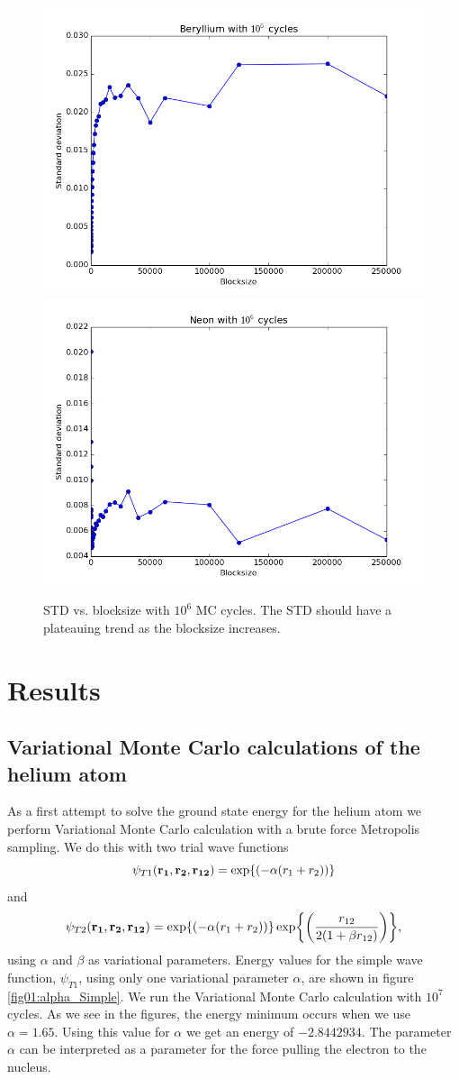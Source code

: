 \documentclass[x11names]{article}
\begin{document}
		\begin{figure}
			\centering \includegraphics[width=0.45\linewidth]{../figures/Beryllium_blocking}
			\centering \includegraphics[width=0.45\linewidth]{../figures/Neon_blocking}
			\protect\caption{STD vs. blocksize with $10^{6}$ MC cycles.  The STD should have a plateauing trend as the blocksize increases.} \label{fig01:std_Stuff}
		\end{figure}


\section{Results}
	\subsection{Variational Monte Carlo calculations of the helium
atom}
		As a first attempt to solve the ground state energy for the helium
		atom we perform Variational Monte Carlo calculation with a brute force
		Metropolis sampling. We do this with two trial wave functions
		\[
		\psi_{T1}({\bf r_{1}},{\bf r_{2}},{\bf r_{12}})=\exp{\left(-\alpha(r_{1}+r_{2})\right)}
		\]
		and
		\[
		\psi_{T2}({\bf r_{1}},{\bf r_{2}},{\bf r_{12}})=\exp{\left(-\alpha(r_{1}+r_{2})\right)}\exp{\left(\frac{r_{12}}{2(1+\beta r_{12})}\right)},
		\]
		using $\alpha$ and $\beta$ as variational parameters. Energy values
		for the simple wave function, $\psi_{T1}$, using only one variational
		parameter $\alpha$, are shown in figure \ref{fig01:alpha_Simple}.
		We run the Variational Monte Carlo calculation with $10^{7}$ cycles.
		As we see in the figures, the energy minimum occurs when we use $\alpha=1.65$.
		Using this value for $\alpha$ we get an energy of $-2.8442934$.
		The parameter $\alpha$ can be interpreted as a parameter for the
		force pulling the electron to the nucleus.
\end{document}
